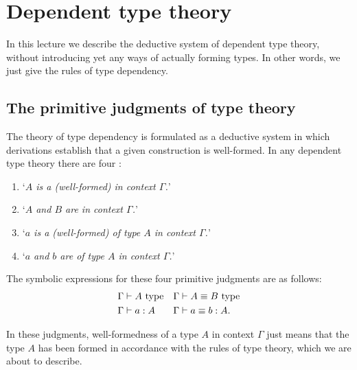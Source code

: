 \chapter{Dependent type theory}
\label{ch:dtt}

In this lecture we describe the deductive system of dependent type theory, without introducing yet any ways of actually forming types. In other words, we just give the rules of type dependency.

\section{The primitive judgments of type theory}

The theory of type dependency is formulated as a deductive system in which derivations establish that a given construction is well-formed. In any dependent type theory there are four :
\begin{enumerate}
\item `\emph{$A$ is a (well-formed)  in context $\Gamma$.}'
\item `\emph{$A$ and $B$ are  in context $\Gamma$.}'
\item `\emph{$a$ is a (well-formed)  of type $A$ in context $\Gamma$.}'
\item `\emph{$a$ and $b$ are  of type $A$ in context $\Gamma$.}'
\end{enumerate}
\begin{samepage}
The symbolic expressions for these four primitive judgments are as follows:
\begin{align*}
\Gamma & \vdash A~\textrm{type} & \Gamma & \vdash A\equiv B~\textrm{type}\\
\Gamma & \vdash a:A & \Gamma & \vdash a\equiv b:A.
\end{align*}
\end{samepage}
In these judgments, well-formedness of a type $A$ in context $\Gamma$ just means that the type $A$ has been formed in accordance with the rules of type theory, which we are about to describe.

